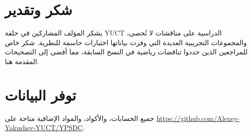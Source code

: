 \documentclass[12pt,a4paper]{article}
\theoremstyle{remark}
\begin{document}
	\section*{شكر وتقدير}
	
	يشكر المؤلف المشاركين في حلقة YUCT الدراسية على مناقشات لا تُحصى، والمجموعات التجريبية العديدة التي وفرت بياناتها اختبارات حاسمة للنظرية. شكر خاص للمراجعين الذين حددوا تناقضات رياضية في النسخ السابقة، مما أفضى إلى التصحيحات المقدمة هنا.
	
	\section*{توفر البيانات}
	
	جميع الحسابات، والأكواد، والمواد الإضافية متاحة على \url{https://github.com/Alexey-Yakushev-YUCT/YPSDC}.
	
\end{document}
